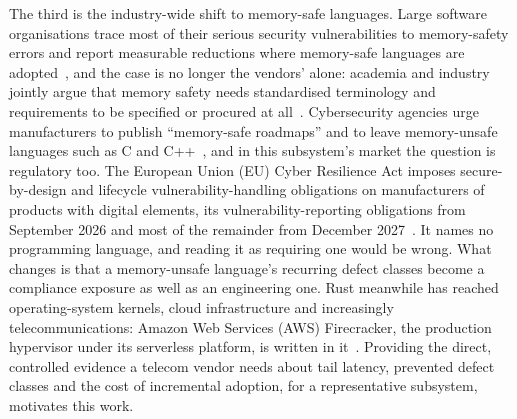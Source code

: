 The third is the industry-wide shift to memory-safe languages. Large software organisations trace
most of their serious security vulnerabilities to memory-safety errors and report measurable
reductions where memory-safe languages are
adopted~\cite{msrc2019memory,google2022android,vanderstoep2025android,google2024securebydesign},
and the case is no longer the vendors' alone: academia and industry jointly argue that memory
safety needs standardised terminology and requirements to be specified or procured at
all~\cite{watson2025memorysafety}. Cybersecurity agencies urge manufacturers to publish
``memory-safe roadmaps'' and to leave memory-unsafe languages such as C and
C++~\cite{cisa2023memorysafe,oncd2024building}, and in this subsystem's market the question is
regulatory too. The European Union (EU) Cyber Resilience Act imposes secure-by-design and
lifecycle vulnerability-handling obligations on manufacturers of products with digital elements,
its vulnerability-reporting obligations from September 2026 and most of the remainder from
December 2027~\cite{eu2024cra}. It names no programming language, and reading it as requiring one
would be wrong. What changes is that a memory-unsafe language's recurring defect classes become a
compliance exposure as well as an engineering one. Rust meanwhile has reached operating-system
kernels, cloud infrastructure and increasingly telecommunications: Amazon Web Services (AWS)
Firecracker, the production hypervisor under its serverless platform, is written in
it~\cite{agache2020firecracker}. Providing the direct, controlled evidence a telecom vendor needs
about tail latency, prevented defect classes and the cost of incremental adoption, for a
representative subsystem, motivates this work.

